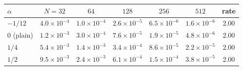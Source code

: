\begin{tabular}{l ccccc c}
\toprule
$\alpha$ & $N=32$ & $64$ & $128$ & $256$ & $512$ & rate\\
\midrule
$-1/12$ & $4.0{\times}10^{-4}$ & $1.0{\times}10^{-4}$ & $2.6{\times}10^{-5}$ & $6.5{\times}10^{-6}$ & $1.6{\times}10^{-6}$ & 2.00\\
0 (plain) & $1.2{\times}10^{-3}$ & $3.0{\times}10^{-4}$ & $7.6{\times}10^{-5}$ & $1.9{\times}10^{-5}$ & $4.8{\times}10^{-6}$ & 2.00\\
$1/4$ & $5.4{\times}10^{-3}$ & $1.4{\times}10^{-3}$ & $3.4{\times}10^{-4}$ & $8.6{\times}10^{-5}$ & $2.2{\times}10^{-5}$ & 2.00\\
$1/2$ & $9.5{\times}10^{-3}$ & $2.4{\times}10^{-3}$ & $6.1{\times}10^{-4}$ & $1.5{\times}10^{-4}$ & $3.8{\times}10^{-5}$ & 2.00\\
\bottomrule
\end{tabular}

